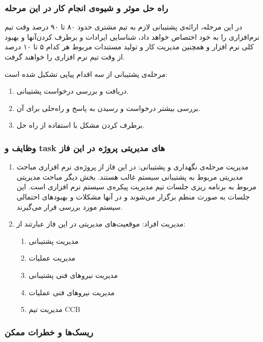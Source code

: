 \subsubsection{راه حل موثر و شیوه‌ی انجام کار در این مرحله}
در این مرحله، ارائه‌ی پشتیبانی لازم به تیم مشتری حدود ۸۰ تا ۹۰ درصد وقت تیم نرم‌افزاری را به خود اختصاص خواهد داد، شناسایی ایرادات و برطرف کردن‌آنها و بهبود کلی نرم افزار و همچنین مدیریت کار و تولید مستندات مربوط هر کدام ۵ تا ۱۰ درصد از وقت تیم نرم افزاری را خواهند گرفت.

مرحله‌ی پشتیبانی از سه اقدام پیاپی تشکیل شده است:
\begin{enumerate}
\item دریافت و بررسی درخواست پشتیبانی.
\item بررسی بیشتر درخواست و رسیدن به پاسخ و راه‌حلی برای آن.
\item برطرف کردن مشکل با استفاده از راه حل.
\end{enumerate}

\subsubsection{وظایف و task های مدیریتی پروژه در این فاز}
\begin{enumerate}
\item مدیریت مرحله‌ی نگهداری و پشتیبانی:
\newline
در این فاز از پروژه‌ی نرم افزاری مباحث مدیریتی مربوط به پشتیبانی سیستم غالب هستند. بخش دیگر مباحث مدیریتی مربوط به برنامه ریزی جلسات تیم مدیریت پیکره‌ی سیستم نرم افزاری  است. این  جلسات به صورت منظم برگزار می‌شوند و در آنها مشکلات و بهبود‌های احتمالی سیستم مورد بررسی قرار می‌گیرند.
\item مدیریت افراد:
\newline
موقعیت‌های مدیریتی در این فاز عبارتند از:
\begin{enumerate}
\item مدیریت پشتیبانی
\item مدیریت عملیات
\item مدیریت نیرو‌های فنی پشتیبانی
\item مدیریت نیرو‌های فنی عملیات
\item مدیریت تیم CCB
\end{enumerate}
\end{enumerate}

\subsubsection{ریسک‌ها و خطرات ممکن}

